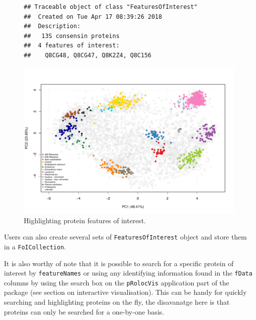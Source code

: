 \begin{figure}[!ht]
  \centering
\begin{knitrout}
\color{fgcolor}\begin{kframe}
\begin{alltt}
 \hlkwb{<-} \hlstd{(}\hlstd{,} \hlstd{,} \hlstd{,} \hlstd{)}
 \hlkwb{<-} \hlstd{(} \hlstd{=} \hlstd{,}
                              
                              
\end{alltt}
\begin{verbatim}
## Traceable object of class "FeaturesOfInterest"
##  Created on Tue Apr 17 08:39:26 2018 
##  Description:
##   13S consensin proteins
##  4 features of interest:
##    Q8CG48, Q8CG47, Q8K2Z4, Q8C156
\end{verbatim}
\begin{alltt}
  \hlstd{=} \hlstd{)}
\end{alltt}
\end{kframe}
\includegraphics[width=.8\textwidth]{figure/foi-1} 

\end{knitrout}
  \caption{Highlighting protein features of interest.}
  \label{fig:foi}
\end{figure}

Users can also create several sets of \texttt{FeaturesOfInterest}
object and store them in a \texttt{FoICollection}.

It is also worthy of note that it is possible to search for a
specific protein of interest by \texttt{featureNames} or using any
identifying information found in the \texttt{fData} columns by using
the search box on the \texttt{pRolocVis} application part of the
 package (see section on interactive
visualisation). This can be handy for quickly searching and
highlighting proteins on the fly, the disavanatge here is that
proteins can only be searched for a one-by-one basis.

